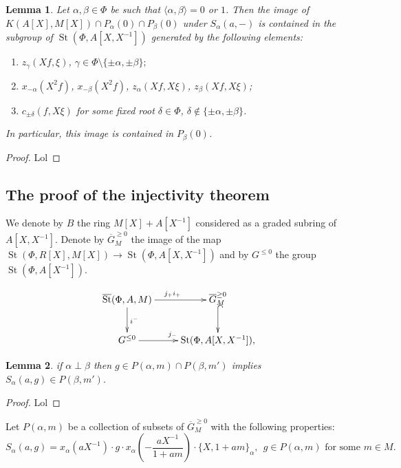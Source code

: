 \documentclass[oneside, 8pt]{amsart}
\newtheorem{lemma}{Lemma}
\theoremstyle{remark}
\theoremstyle{definition}
\DeclareMathOperator{\St}{St}
\numberwithin{equation}{section}
\begin{document}
\begin{lemma}
 Let $\alpha, \beta \in \Phi$ be such that $\langle \alpha,\beta \rangle = 0$ or $1$.
 Then the image of $K(A[X], M[X]) \cap P_\alpha(0) \cap P_\beta(0)$ under $S_{\alpha}(a, -)$ is contained in the subgroup of $\St(\Phi, A[X, X^{-1}])$
  generated by the following elements:
  \begin{enumerate}
   \item $z_\gamma(Xf, \xi)$, $\gamma \in \Phi \setminus\{ \pm \alpha, \pm \beta\};$
   \item $x_{-\alpha}(X^2f)$, $x_{-\beta}(X^2f)$, $z_{\alpha}(Xf, X\xi)$, $z_\beta(Xf, X\xi)$;
   \item $c_{\pm \delta}(f, X\xi)$ for some fixed root $\delta \in \Phi$, $\delta \not \in \{ \pm \alpha, \pm \beta \}$.
  \end{enumerate}
 In particular, this image is contained in $P_\beta(0)$.
\end{lemma}
\begin{proof}
Lol
\end{proof}  
  
\subsection{The proof of the injectivity theorem}
We denote by $B$ the ring $M[X] + A[X^{-1}]$ considered as a graded subring of $A[X, X^{-1}]$.
Denote by $\overline{G}^{\geq 0}_M$ the image of the map $\St(\Phi, R[X], M[X]) \to \St(\Phi, A[X, X^{-1}])$ and by
 $G^{\leq 0}$ the group $\St(\Phi, A[X^{-1}])$.

\[ \xymatrix{ \overline{\St}(\Phi, A, M) \ar[r]^{j_+i_+} \ar[d]^{i^-} & \overline{G}_M^{\geq 0} \ar@{^{(}->}[d] \\
              G^{\leq 0} \ar[r]^{j_-} & \St(\Phi, A[X, X^{-1}]), } \] 

\begin{lemma} if $\alpha \perp \beta$ then $g \in P(\alpha, m) \cap P(\beta, m')$ implies $S_\alpha(a, g) \in P(\beta, m')$. \end{lemma}
\begin{proof}
 Lol
\end{proof}

Let $P(\alpha, m)$ be a collection of subsets of $\overline{G}^{\geq 0}_M$ with the following properties:
\[ S_\alpha(a, g) = x_\alpha(aX^{-1})\cdot g \cdot x_\alpha\left(-\frac{aX^{-1}}{1 + am}\right) \cdot \{X, 1+ am\}_\alpha,\ \ g \in P(\alpha, m)\text{ for some $m \in M$}.\]
\end{document}
